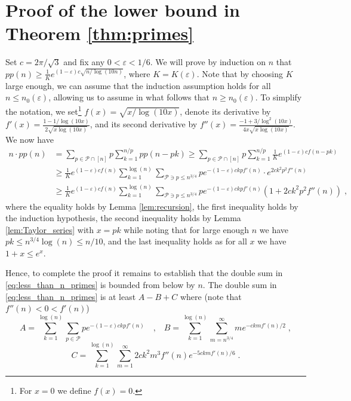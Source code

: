 \documentclass[11pt]{article}
\theoremstyle{plain}
\begin{document}
\section{Proof of the lower bound in Theorem \ref{thm:primes}}\label{sec:proofprimelower}
Set $c=2\pi/\sqrt{3}$ and fix any $0 < \varepsilon<1/6$. We will prove by induction on $n$ that $pp(n) \geq \frac{1}{K}e^{(1-\varepsilon)c\sqrt{n/\log(10n)}}$, where $K=K(\varepsilon)$. Note that by choosing $K$ large enough, we can assume that the induction assumption holds for all $n \leq n_0(\varepsilon)$, allowing us to assume in what follows that $n \geq n_0(\varepsilon)$. To simplify the notation, we set\footnote{For $x=0$ we define $f(x)=0$.} $f(x)=\sqrt{x/\log(10x)}$, denote its derivative by $f'(x)=\frac{1-1/\log(10x)}{2\sqrt{x\log(10x)}}$, and its second derivative by $f''(x)=\frac{-1+3/\log^2(10x)}{4x\sqrt{x\log(10x)}}$. We now have
\begin{align}\label{eq:less_than_n_primes}
    n\cdot pp(n) &= \sum_{p\in \mathcal{P}\cap[n]} p\sum _{k=1}^{n/p} pp(n-pk) \geq \sum_{p\in \mathcal{P}\cap[n]} p\sum _{k=1}^{n/p} \frac{1}{K} e^{(1-\varepsilon)cf(n-pk)}\nonumber\\
    &\geq \frac{1}{K}e^{(1-\varepsilon)cf(n)}\sum _{k=1}^{\log(n)} \sum_{\mathcal{P}\ni p\leq n^{3/4}} pe^{-(1-\varepsilon)ckpf'(n)}\cdot e^{2ck^2p^2f''(n)}\nonumber \\
    &\geq \frac{1}{K}e^{(1-\varepsilon)cf(n)}\sum _{k=1}^{\log(n)} \sum_{\mathcal{P}\ni p\leq n^{3/4}} pe^{-(1-\varepsilon)ckpf'(n)}(1+2ck^2p^2f''(n))\;,
\end{align}
where the equality holds by Lemma \ref{lem:recursion}, the first inequality holds by the induction hypothesis, the second inequality holds by Lemma \ref{lem:Taylor_series} with
$x=pk$ while noting that for large enough $n$ we have $pk\leq n^{3/4}\log(n) \leq n/10$, and the last inequality holds as for all $x$ we have $1+x\leq e^{x}$.

Hence, to complete the proof it remains to establish that the double sum in \eqref{eq:less_than_n_primes} is bounded from below by $n$.
The double sum in \eqref{eq:less_than_n_primes} is at least $A-B+C$ where (note that $f''(n) < 0 < f'(n)$)
\[
    A= \sum _{k=1}^{\log(n)}\sum_{p\in \mathcal{P}} pe^{-(1-\varepsilon) ckp f'(n)} \quad\text{,}\quad B=\sum_{k=1}^{\log(n)}\sum_{m=n^{3/4}}^{\infty} me^{- ckm f'(n)/2}\;,
\]
\[
    C=\sum _{k=1}^{\log(n)}\sum_{m=1}^{\infty}  2c k^2 m^3f''(n)e^{- 5ckm f'(n)/6}\;.
\]
\end{document}
